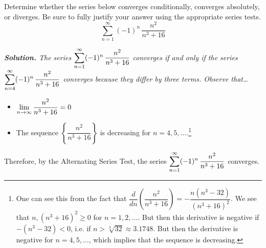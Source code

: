 \documentclass[12pt,letterpaper]{exam}
\begin{document}
\examtitle
{} 
\scores
\bottomline
\newpage


\begin{questions}

\newpage
\question[25] Determine whether the series below converges conditionally, converges absolutely, or diverges. Be sure to fully justify your answer using the appropriate series tests.
	\[
	\sum_{n=1}^\infty (-1)^n \, \dfrac{n^2}{n^3 + 16}
	\] \pspace

{\small\itshape \textbf{Solution.} The series $\displaystyle\sum_{n=1}^\infty (-1)^n \, \dfrac{n^2}{n^3 + 16}$ converges if and only if the series $\displaystyle\sum_{n=4}^\infty (-1)^n \, \dfrac{n^2}{n^3 + 16}$ converges because they differ by three terms. Observe that\dots
	\begin{itemize}
	\item $\displaystyle\lim_{n \to \infty} \dfrac{n^2}{n^3 + 16}= 0$
	\item The sequence $\left\{ \dfrac{n^2}{n^3 + 16} \right\}$ is decreasing for $n= 4, 5, \ldots$.\footnote{\tiny One can see this from the fact that $\dfrac{d}{dn} \left( \dfrac{n^2}{n^3 + 16} \right)= -\dfrac{n(n^3 - 32)}{(n^3 + 16)^2}$. We see that $n, (n^3 + 16)^2 \geq 0$ for $n= 1, 2, \ldots$. But then this derivative is negative if $-(n^3 - 32) < 0$, i.e. if $n > \sqrt[3]{32} \approx 3.1748$. But then the derivative is negative for $n= 4, 5, \ldots$, which implies that the sequence is decreasing.}
	\end{itemize}
Therefore, by the Alternating Series Test, the series $\displaystyle \sum_{n=1}^\infty (-1)^n \, \dfrac{n^2}{n^3 + 16}$ converges. \pspace

}
\end{questions}
\end{document}
